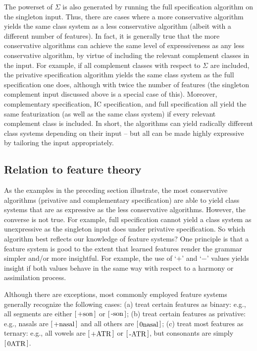 \documentclass[12pt, oneside]{article}   	%
\newcommand{\featmat}[1]
{$\begin{bsmallmatrix*}[l]\text{\normalsize #1}\end{bsmallmatrix*}$}
\begin{document}
The powerset of $\Sigma$ is also generated by running the full specification algorithm on the singleton input. Thus, there are cases where a more conservative algorithm yields the same class system as a less conservative algorithm (albeit with a different number of features). In fact, it is generally true that the more conservative algorithms can achieve the same level of expressiveness as any less conservative algorithm, by virtue of including the relevant complement classes in the input. For example, if all complement classes with respect to $\Sigma$ are included, the privative specification algorithm yields the same class system as the full specification one does, although with twice the number of features (the singleton complement input discussed above is a special case of this). Moreover, complementary specification, IC specification, and full specification all yield the same featurization (as well as the same class system) if every relevant complement class is included. In short, the algorithms can yield radically different class systems depending on their input -- but all can be made highly expressive by tailoring the input appropriately.

\subsection{Relation to feature theory}

As the examples in the preceding section illustrate, the most conservative algorithms (privative and complementary specification) are able to yield class systems that are as expressive as the less conservative algorithms. However, the converse is not true. For example, full specification cannot yield a class system as unexpressive as the singleton input does under privative specification. So which algorithm best reflects our knowledge of feature systems? One principle is that a feature system is good to the extent that learned features render the grammar simpler and/or more insightful. For example, the use of `$+$' and `$-$' values yields insight if both values behave in the same way with respect to a harmony or assimilation process.

Although there are exceptions, most commonly employed feature systems generally recognize the following cases: (a) treat certain features as binary: e.g., all segments are either \featmat{+son} or \featmat{-son}; (b) treat certain features as privative: e.g., nasals are \featmat{+nasal} and all others are \featmat{0nasal}; (c) treat most features as ternary: e.g., all vowels are \featmat{+ATR} or \featmat{-ATR}, but consonants are simply \featmat{0ATR}.
\end{document}
